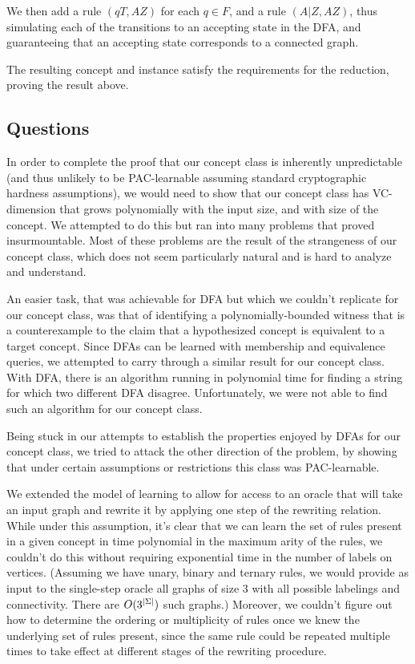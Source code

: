 \documentclass[]{article}
\begin{document}
We then add a rule $(qT, AZ)$ for each $q\in F$, and a rule $(A|Z,AZ)$, thus
simulating each of the transitions to an accepting state in the DFA, and
guaranteeing that an accepting state corresponds to a connected graph.

The resulting concept and instance satisfy the requirements for the reduction,
proving the result above.

\subsection{Questions}

In order to complete the proof that our concept class is inherently
unpredictable (and thus unlikely to be PAC-learnable assuming standard
cryptographic hardness assumptions), we would need to show that our concept
class has VC-dimension that grows polynomially with the input size, and with
size of the concept. We attempted to do this but ran into many problems that
proved insurmountable. Most of these problems are the result of the strangeness
of our concept class, which does not seem particularly natural and is hard to
analyze and understand.

An easier task, that was achievable for DFA but which we
couldn't replicate for our concept class, was that of identifying a
polynomially-bounded witness that is a counterexample to the claim that a
hypothesized concept is equivalent to a target concept.
Since DFAs can be learned with membership and equivalence queries, we attempted
to carry through a similar result for our concept class. With DFA, there is an
algorithm running in polynomial time for finding a string for which two different DFA
disagree. Unfortunately, we were not able to find such an
algorithm for our concept class.

Being stuck in our attempts to establish the properties enjoyed by DFAs for our
concept class, we tried to attack the other direction of the problem, by showing
that under certain assumptions or restrictions this class was PAC-learnable.

We extended the model of learning to allow for access to an oracle
that will take an input graph and rewrite it by applying one step of the
rewriting relation. While under this assumption, it's clear that we can learn
the set of rules present in a given concept in time polynomial in the maximum
arity of the rules, we couldn't do this without requiring exponential time in the number
of labels on vertices. (Assuming we have unary, binary and ternary rules, we would 
provide as input to the single-step oracle all graphs of size 3 with
all possible labelings and connectivity. There are
$O(3^{\left| \Sigma \right|})$ such graphs.) Moreover, we couldn't figure out
how to determine the ordering or multiplicity of rules once we knew
the underlying set of rules present, since the same rule could be
repeated multiple times to take effect at 
different stages of the rewriting procedure.
\end{document}
